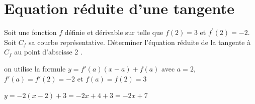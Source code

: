 \documentclass[12pt,a4paper]{article}  %
\begin{document}
\section*{Equation réduite d'une tangente}

\exercice{}

Soit une fonction $f$ définie et dérivable sur \R telle que $f(2)=3$ et $f^{\prime}(2)=-2$.
Soit $C_f$ sa courbe représentative. Déterminer l'équation réduite de la tangente à $C_f$ au point d'abscisse 2 .

\begin{corrBox}
	on utilise la formule $y=f'(a)(x-a)+f(a)$ avec $a =2$, $f'(a)=f'(2)=-2$ et $f(a)=f(2)=3$
	
	$y=-2(x-2)+3=-2x+4+3=-2x+7$	
\end{corrBox}

\exercice{}
\end{document}
